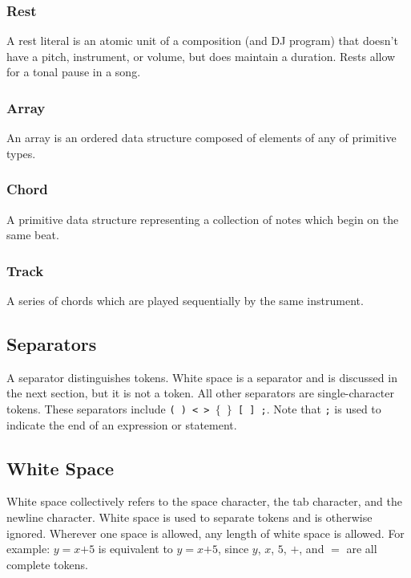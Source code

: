 \documentclass[letterpaper]{article}
\begin{document}
\subsubsection{Rest}
A rest literal is an atomic unit of a composition (and DJ program) that doesn't have a pitch, instrument, or volume, but does maintain a duration. Rests allow for a tonal pause in a song.

\subsubsection{Array}
An array is an ordered data structure composed of elements of any of primitive types. 

\subsubsection{Chord}
A primitive data structure representing a collection of notes which begin on the same beat. 

\subsubsection{Track}
A series of chords which are played sequentially by the same instrument.

\subsection{Separators}
A separator distinguishes tokens. White space is a separator and is discussed in the next section, but it is not a token. All other separators are single-character tokens. These separators include \texttt{( ) \textless\  \textgreater\ $\{$ $\}$ [ ] ;}. Note that \texttt{;}  is used to indicate the end of an expression or statement. 

\subsection{White Space}
White space collectively refers to the space character, the tab character, and the newline character. White space is used to separate tokens and is otherwise ignored. Wherever one space is allowed, any length of white space is allowed.
For example: $y$$=$$x$$+$$5$ is equivalent to $y$\textvisiblespace $=$\textvisiblespace  \textvisiblespace $x$\textvisiblespace $+$\textvisiblespace $5$, since $y$, $x$, $5$, $+$, and $=$ are all complete tokens.
\end{document}
